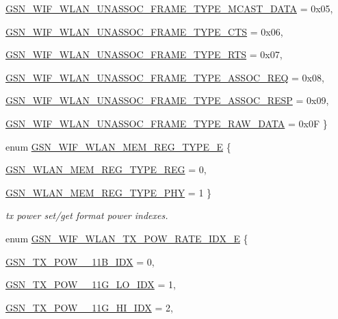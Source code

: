 \begin{DoxyCompactItemize}
\par
\hyperlink{a00677_ga1b471d184450287e7d0cec7c8d0c4639a47894d5ef4ea5c63d55071dd6dd530f7}{GSN\_\-WIF\_\-WLAN\_\-UNASSOC\_\-FRAME\_\-TYPE\_\-MCAST\_\-DATA} =  0x05, 
\par
\hyperlink{a00677_ga1b471d184450287e7d0cec7c8d0c4639a97eb3dc0c8c3ee43bbf0e33589f5c4db}{GSN\_\-WIF\_\-WLAN\_\-UNASSOC\_\-FRAME\_\-TYPE\_\-CTS} =  0x06, 
\par
\hyperlink{a00677_ga1b471d184450287e7d0cec7c8d0c4639a79093fed4376498349c129018d4768b7}{GSN\_\-WIF\_\-WLAN\_\-UNASSOC\_\-FRAME\_\-TYPE\_\-RTS} =  0x07, 
\par
\hyperlink{a00677_ga1b471d184450287e7d0cec7c8d0c4639ae39c218fa34351449d92015556136ff9}{GSN\_\-WIF\_\-WLAN\_\-UNASSOC\_\-FRAME\_\-TYPE\_\-ASSOC\_\-REQ} =  0x08, 
\par
\hyperlink{a00677_ga1b471d184450287e7d0cec7c8d0c4639ac3071712b6eb1e59af20aa583c922850}{GSN\_\-WIF\_\-WLAN\_\-UNASSOC\_\-FRAME\_\-TYPE\_\-ASSOC\_\-RESP} =  0x09, 
\par
\hyperlink{a00677_ga1b471d184450287e7d0cec7c8d0c4639a4af1fb914b96e09e325938e2a7e68d91}{GSN\_\-WIF\_\-WLAN\_\-UNASSOC\_\-FRAME\_\-TYPE\_\-RAW\_\-DATA} =  0x0F
 \}
\item 
enum \hyperlink{a00677_ga7f657dfcb65c6810c23ae68bbca0b101}{GSN\_\-WIF\_\-WLAN\_\-MEM\_\-REG\_\-TYPE\_\-E} \{ \par
\hyperlink{a00640_gga7f657dfcb65c6810c23ae68bbca0b101aba4ce9371ded92ab818bd48b24d1b74f}{GSN\_\-WLAN\_\-MEM\_\-REG\_\-TYPE\_\-REG} =  0, 
\par
\hyperlink{a00640_gga7f657dfcb65c6810c23ae68bbca0b101afd4788d7537c66f77185272b27a0479e}{GSN\_\-WLAN\_\-MEM\_\-REG\_\-TYPE\_\-PHY} =  1
 \}
\begin{DoxyCompactList}\small\item\em tx power set/get format power indexes. \end{DoxyCompactList}\item 
enum \hyperlink{a00677_ga75fc31972dc5127c4ee4b3e585ab0206}{GSN\_\-WIF\_\-WLAN\_\-TX\_\-POW\_\-RATE\_\-IDX\_\-E} \{ \par
\hyperlink{a00640_gga75fc31972dc5127c4ee4b3e585ab0206aa8ef942d0ca232cab8243a718383af18}{GSN\_\-TX\_\-POW\_\_\-11B\_\-IDX} =  0, 
\par
\hyperlink{a00640_gga75fc31972dc5127c4ee4b3e585ab0206ae3826b232cc1ee4a30d46890b0718bb0}{GSN\_\-TX\_\-POW\_\_\-11G\_\-LO\_\-IDX} =  1, 
\par
\hyperlink{a00640_gga75fc31972dc5127c4ee4b3e585ab0206aa05a5fdd8b3cbb522655e6c2e400bd23}{GSN\_\-TX\_\-POW\_\_\-11G\_\-HI\_\-IDX} =  2, 

\end{DoxyCompactItemize}
